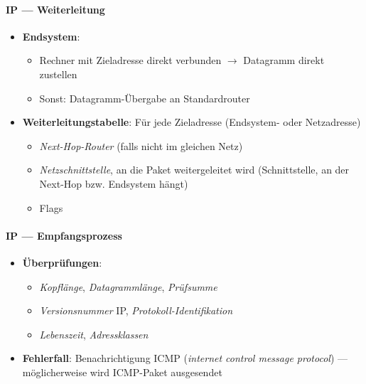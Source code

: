 \paragraph{IP --- Weiterleitung}
\begin{itemize}
  \item \textbf{Endsystem}:
  \begin{itemize}
    \item Rechner mit Zieladresse direkt verbunden \( \to \) Datagramm direkt zustellen
    \item Sonst: Datagramm-Übergabe an Standardrouter
  \end{itemize}
  \item \textbf{Weiterleitungstabelle}: Für jede Zieladresse (Endsystem- oder Netzadresse)
  \begin{itemize}
    \item \emph{Next-Hop-Router} (falls nicht im gleichen Netz)
    \item \emph{Netzschnittstelle}, an die Paket weitergeleitet wird (Schnittstelle, an der Next-Hop bzw. Endsystem hängt)
    \item Flags
  \end{itemize}
\end{itemize}

\paragraph{IP --- Empfangsprozess}
\begin{itemize}
  \item \textbf{Überprüfungen}:
  \begin{itemize}
    \item \emph{Kopflänge}, \emph{Datagrammlänge}, \emph{Prüfsumme}
    \item \emph{Versionsnummer} IP, \emph{Protokoll-Identifikation}
    \item \emph{Lebenszeit}, \emph{Adressklassen}
  \end{itemize}
  \item \textbf{Fehlerfall}: Benachrichtigung ICMP (\emph{internet control message protocol}) --- möglicherweise wird ICMP-Paket ausgesendet
\end{itemize}

